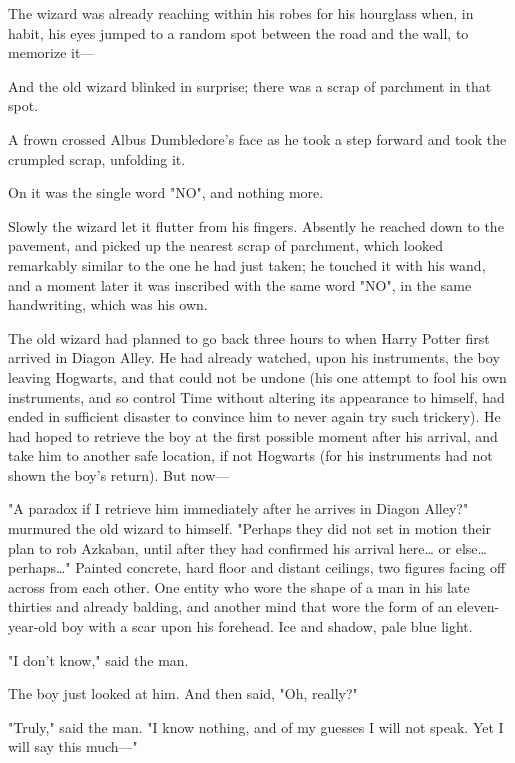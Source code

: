 The wizard was already reaching within his robes for his hourglass when, in 
habit, his eyes jumped to a random spot between the road and the wall, to 
memorize it---

And the old wizard blinked in surprise; there was a scrap of parchment in that 
spot.

A frown crossed Albus Dumbledore's face as he took a step forward and took the 
crumpled scrap, unfolding it.

On it was the single word "NO", and nothing more.

Slowly the wizard let it flutter from his fingers. Absently he reached down to 
the pavement, and picked up the nearest scrap of parchment, which looked 
remarkably similar to the one he had just taken; he touched it with his wand, 
and a moment later it was inscribed with the same word "NO", in the same 
handwriting, which was his own.

The old wizard had planned to go back three hours to when Harry Potter first 
arrived in Diagon Alley. He had already watched, upon his instruments, the boy 
leaving Hogwarts, and that could not be undone (his one attempt to fool his own 
instruments, and so control Time without altering its appearance to himself, 
had ended in sufficient disaster to convince him to never again try such 
trickery). He had hoped to retrieve the boy at the first possible moment after 
his arrival, and take him to another safe location, if not Hogwarts (for his 
instruments had not shown the boy's return). But now---

"A paradox if I retrieve him immediately after he arrives in Diagon Alley?" 
murmured the old wizard to himself. "Perhaps they did not set in motion their 
plan to rob Azkaban, until after they had confirmed his arrival here{\ldots} or 
else{\ldots} perhaps{\ldots}"
\sbreak
Painted concrete, hard floor and distant ceilings, two figures facing off 
across from each other. One entity who wore the shape of a man in his late 
thirties and already balding, and another mind that wore the form of an 
eleven-year-old boy with a scar upon his forehead. Ice and shadow, pale blue 
light.

"I don't know," said the man.

The boy just looked at him. And then said, "Oh, really?"

"Truly," said the man. "I know nothing, and of my guesses I will not speak. Yet 
I will say this much---"